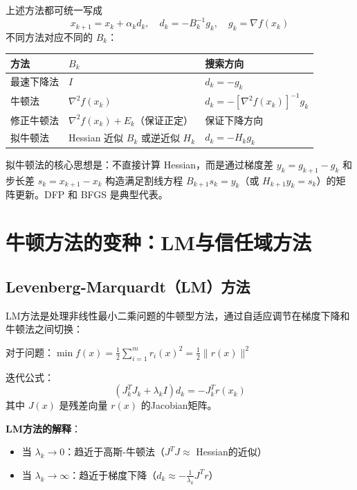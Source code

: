 \begin{notebox}
上述方法都可统一写成
\[
x_{k+1} = x_k + \alpha_k d_k, \quad d_k = -B_k^{-1} g_k, \quad g_k = \nabla f(x_k)
\]
不同方法对应不同的 $B_k$：
\begin{center}
\begin{tabular}{@{}lll@{}}
\toprule
\textbf{方法} & $B_k$ & \textbf{搜索方向} \\
\midrule
最速下降法 & $I$ & $d_k = -g_k$ \\
牛顿法 & $\nabla^2 f(x_k)$ & $d_k = -[\nabla^2 f(x_k)]^{-1} g_k$ \\
修正牛顿法 & $\nabla^2 f(x_k) + E_k$（保证正定） & 保证下降方向 \\
拟牛顿法 & Hessian 近似 $B_k$ 或逆近似 $H_k$ & $d_k = -H_k g_k$ \\
\bottomrule
\end{tabular}
\end{center}
拟牛顿法的核心思想是：不直接计算 Hessian，而是通过梯度差 $y_k = g_{k+1} - g_k$ 和步长差 $s_k = x_{k+1} - x_k$ 构造满足割线方程 $B_{k+1} s_k = y_k$（或 $H_{k+1} y_k = s_k$）的矩阵更新。DFP 和 BFGS 是典型代表。
\end{notebox}

\section{牛顿方法的变种：LM与信任域方法}\label{sec:lm-trust}

\subsection{Levenberg-Marquardt（LM）方法}\label{sec:lm}

\begin{conceptbox}[LM方法]
LM方法是处理非线性最小二乘问题的牛顿型方法，通过自适应调节在梯度下降和牛顿法之间切换：

对于问题：$\min f(x) = \frac{1}{2}\sum_{i=1}^{m} r_i(x)^2 = \frac{1}{2}\|r(x)\|^2$

迭代公式：
\[
(J_k^T J_k + \lambda_k I) d_k = -J_k^T r(x_k)
\]
其中 $J(x)$ 是残差向量 $r(x)$ 的Jacobian矩阵。
\end{conceptbox}

\textbf{LM方法的解释}：
\begin{itemize}
    \item 当 $\lambda_k \to 0$：趋近于高斯-牛顿法（$J^T J \approx$ Hessian的近似）
    \item 当 $\lambda_k \to \infty$：趋近于梯度下降（$d_k \approx -\frac{1}{\lambda_k} J^T r$）
\end{itemize}

